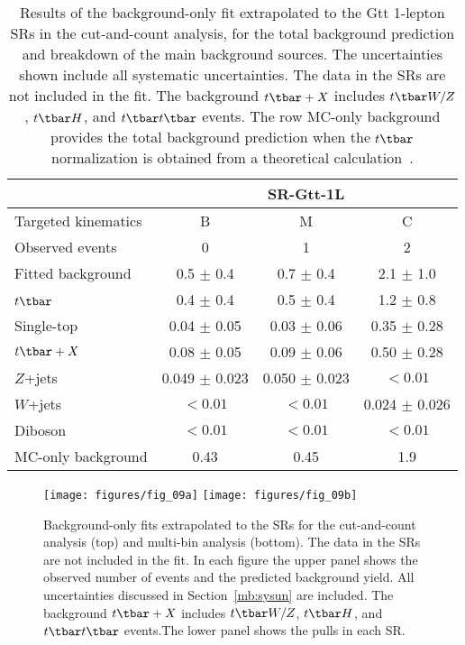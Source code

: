 \begin{table*}[htbp]
	\centering
	\begin{tabular}{lccc}
		\toprule
		& \multicolumn{3}{c}{SR-Gtt-1L} \\
		\midrule
		Targeted kinematics & B                 & M                 & C                 \\[-0.05cm]
		\midrule
		Observed events     & 0                 & 1                 & 2                 \\
		\midrule
		Fitted background   & 0.5 $\pm$ 0.4     & 0.7 $\pm$ 0.4     & 2.1 $\pm$ 1.0     \\
		\midrule
		$t\tbar$\           & 0.4 $\pm$ 0.4     & 0.5 $\pm$ 0.4     & 1.2 $\pm$ 0.8     \\
		Single-top          & 0.04 $\pm$ 0.05   & 0.03 $\pm$ 0.06   & 0.35 $\pm$ 0.28   \\
		$t\tbar+X$          & 0.08 $\pm$ 0.05   & 0.09 $\pm$ 0.06   & 0.50 $\pm$ 0.28   \\
		$Z$+jets            & 0.049 $\pm$ 0.023 & 0.050 $\pm$ 0.023 & $<0.01$           \\
		$W$+jets            & $<0.01$           & $<0.01$           & 0.024 $\pm$ 0.026 \\
		Diboson             & $<0.01$           & $<0.01$           & $<0.01$           \\
		\midrule
		MC-only background  & 0.43              & 0.45              & 1.9               \\
		\bottomrule
	\end{tabular}

	\caption{Results of the background-only fit extrapolated to the Gtt
		1-lepton SRs in the cut-and-count analysis, for the total background
		prediction and breakdown of the main background sources. The uncertainties
		shown include all systematic uncertainties. The data in the SRs are not
		included in the fit. The background $t\tbar+X$ includes $t\tbar W/Z$,
		$t\tbar H$, and $t\tbar t\tbar$ events. The row MC-only background provides
		the total background prediction when the $t\tbar$ normalization is obtained
		from a theoretical calculation~\cite{Czakon:2011xx}. }

	\label{tab:yield_discovery}

\end{table*}

\clearpage

\begin{figure}[H]
	\texttt{[image: figures/fig\_09a]}
	\texttt{[image: figures/fig\_09b]}
	\centering

	\caption{Background-only fits extrapolated to the SRs for the cut-and-count
		analysis (top) and multi-bin analysis (bottom). The data in the SRs are not
		included in the fit. In each figure the upper panel shows the observed number
		of events and the predicted background yield. All uncertainties discussed in
		Section~\ref{mb:sysun} are included. The background $t\tbar+X$ includes $t\tbar
			W/Z$, $t\tbar H$, and $t\tbar t\tbar$ events.The lower panel shows the pulls in
		each SR.}

	\label{f:fig_09ab}

\end{figure}

